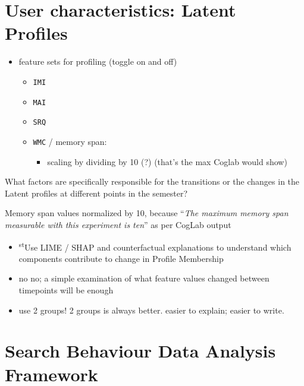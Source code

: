 \documentclass[letterpaper, nobind]{templates/ociamthesis}
\providecommand{\tightlist}{%
  \setlength{\itemsep}{0pt}\setlength{\parskip}{0pt}}
\renewcommand{\st}{\textsuperscript{st}}
\begin{document}
\hypertarget{user-characteristics-latent-profiles}{%
\section{User characteristics: Latent Profiles}\label{user-characteristics-latent-profiles}}

\begin{itemize}
\tightlist
\item
  feature sets for profiling (toggle on and off)

  \begin{itemize}
  \tightlist
  \item
    \texttt{IMI}
  \item
    \texttt{MAI}
  \item
    \texttt{SRQ}
  \item
    \texttt{WMC} / memory span:

    \begin{itemize}
    \tightlist
    \item
      scaling by dividing by 10 (?) (that's the max Coglab would show)
    \end{itemize}
  \end{itemize}
\end{itemize}

What factors are specifically responsible for the transitions or the changes in the Latent profiles at different points in the semester?

Memory span values normalized by 10, because ``\emph{The maximum memory span measurable with this experiment is ten}'' as per CogLab output

\begin{itemize}
\tightlist
\item
  \st{Use LIME / SHAP and counterfactual explanations to understand which components contribute to change in Profile Membership}
\item
  no no; a simple examination of what feature values changed between timepoints will be enough
\item
  use 2 groups! 2 groups is always better. easier to explain; easier to write.
\end{itemize}

\hypertarget{search-behaviour-data-analysis-framework}{%
\section{Search Behaviour Data Analysis Framework}\label{search-behaviour-data-analysis-framework}}
\end{document}
